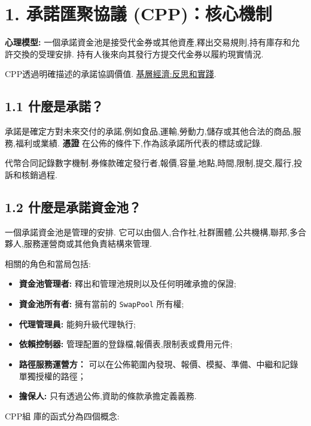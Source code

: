 \documentclass[11pt]{article}
\begin{document}
\section*{1. 承諾匯聚協議 (CPP)：核心機制}

\textbf{心理模型:} 一個承諾資金池是接受代金券或其他資產,釋出交易規則,持有庫存和允許交換的受理安排. 持有人後來向其發行方提交代金券以履約現實情況.

CPP透過明確描述的承諾協調價值. \href{https://willruddick.substack.com/p/grassroots-economics-the-book-is}{基層經濟:反思和實踐}.

\subsection*{1.1 什麼是承諾？}

承諾是確定方對未來交付的承諾,例如食品,運輸,勞動力,儲存或其他合法的商品,服務,福利或業績. \textbf{憑證} 在公佈的條件下,作為該承諾所代表的標誌或記錄.

代幣合同記錄數字機制.券條款確定發行者,報價,容量,地點,時間,限制,提交,履行,投訴和核銷過程.

\subsection*{1.2 什麼是承諾資金池？}

一個承諾資金池是管理的安排. 它可以由個人,合作社,社群團體,公共機構,聯邦,多合夥人,服務運營商或其他負責結構來管理.

相關的角色和當局包括:

\begin{itemize}[leftmargin=*]
\item \textbf{資金池管理者:} 釋出和管理池規則以及任何明確承擔的保證;
\item \textbf{資金池所有者:} 擁有當前的 \texttt{SwapPool} 所有權;
\item \textbf{代理管理員:} 能夠升級代理執行;
\item \textbf{依賴控制器:} 管理配置的登錄檔,報價表,限制表或費用元件;
\item \textbf{路徑服務運營方：} 可以在公佈範圍內發現、報價、模擬、準備、中繼和記錄單獨授權的路徑；
\item \textbf{擔保人:} 只有透過公佈,資助的條款承擔定義義務.
\end{itemize}
CPP組 庫的函式分為四個概念:
\end{document}
